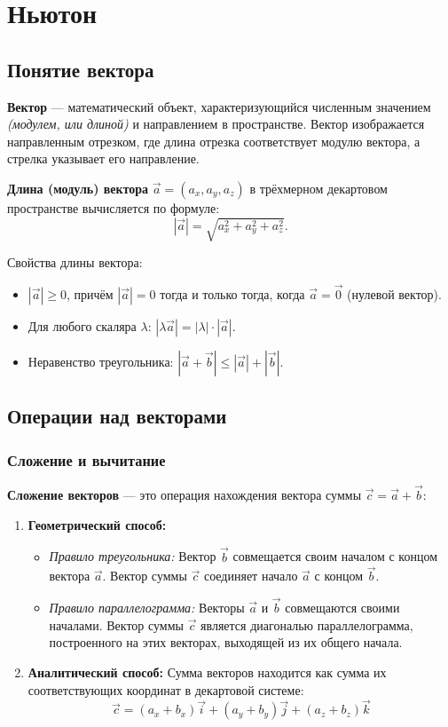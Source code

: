\section{Ньютон}

\subsection{Понятие вектора}

\textbf{Вектор} — математический объект, характеризующийся численным значением \textit{(модулем, или длиной)} и направлением в пространстве. Вектор изображается направленным отрезком, где длина отрезка соответствует модулю вектора, а стрелка указывает его направление.

\textbf{Длина (модуль) вектора} $\vec{a} = (a_x, a_y, a_z)$ в трёхмерном декартовом пространстве вычисляется по формуле:
\[
|\vec{a}| = \sqrt{a_x^2 + a_y^2 + a_z^2}.
\]

Свойства длины вектора:
\begin{itemize}
    \item $|\vec{a}| \geq 0$, причём $|\vec{a}| = 0$ тогда и только тогда, когда $\vec{a} = \vec{0}$ (нулевой вектор).
    \item Для любого скаляра $\lambda$: $|\lambda \vec{a}| = |\lambda| \cdot |\vec{a}|$.
    \item Неравенство треугольника: $|\vec{a} + \vec{b}| \leq |\vec{a}| + |\vec{b}|$.
\end{itemize}

\subsection{Операции над векторами}

\subsubsection{Сложение и вычитание}

\textbf{Сложение векторов} — это операция нахождения вектора суммы $\vec{c} = \vec{a} + \vec{b}$:

\begin{enumerate}
    \item \textbf{Геометрический способ:}
    \begin{itemize}
        \item \textit{Правило треугольника:} Вектор $\vec{b}$ совмещается своим началом с концом вектора $\vec{a}$. Вектор суммы $\vec{c}$ соединяет начало $\vec{a}$ с концом $\vec{b}$.
        \item \textit{Правило параллелограмма:} Векторы $\vec{a}$ и $\vec{b}$ совмещаются своими началами. Вектор суммы $\vec{c}$ является диагональю параллелограмма, построенного на этих векторах, выходящей из их общего начала.
    \end{itemize}
    
    \item \textbf{Аналитический способ:}
    Сумма векторов находится как сумма их соответствующих координат в декартовой системе:
    \[
        \vec{c} = (a_x + b_x)\vec{i} + (a_y + b_y)\vec{j} + (a_z + b_z)\vec{k}
    \]
\end{enumerate}

